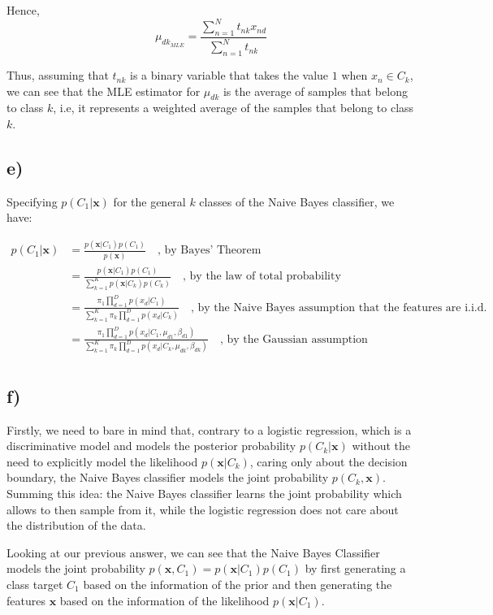 \documentclass[12pt,a4paper,oneside]{paper}
\begin{document}
Hence, 
$$
\mu_{dk_{MLE}} = \frac{\sum_{n=1}^{N} t_{nk} x_{nd}}{\sum_{n=1}^{N} t_{nk}}
$$

Thus, assuming that $t_{nk}$ is a binary variable that takes the value $1$ when $x_n \in C_k$, we can see that the MLE estimator for $\mu_{dk}$ is the average of samples that belong to class $k$, i.e, 
it represents a weighted average of the samples that belong to class $k$.

\newpage
\subsection*{e)}

Specifying $p(C_1 | \bm{x})$ for the general $k$ classes of the Naive Bayes classifier, we have:

\begin{align*}
    p(C_1 | \bm{x}) &= \frac{p(\bm{x} | C_1) p(C_1)}{p(\bm{x})} \quad \text{, by Bayes' Theorem} \\
    &= \frac{p(\bm{x} | C_1) p(C_1)}{\sum_{k=1}^{K} p(\bm{x} | C_k) p(C_k)} \quad \text{, by the law of total probability} \\
    &= \frac{\pi_1 \prod_{d=1}^{D} p(x_d | C_1)}{\sum_{k=1}^{K} \pi_k \prod_{d=1}^{D} p(x_d | C_k)} \quad \text{, by the Naive Bayes assumption that the features are i.i.d.} \\
    &= \frac{\pi_1 \prod_{d=1}^{D} p(x_d | C_1, \mu_{d1}, \beta_{d1})}{\sum_{k=1}^{K} \pi_k \prod_{d=1}^{D} p(x_d | C_k, \mu_{dk}, \beta_{dk})} \quad \text{, by the Gaussian assumption} \\
\end{align*}

\newpage
\subsection*{f)}

Firstly, we need to bare in mind that, contrary to a logistic regression, which is a discriminative model and
models the posterior probability $p(C_k | \bm{x})$ without the need to explicitly model the likelihood $p(\bm{x} | C_k)$, caring only about the decision boundary, the Naive Bayes
classifier models the joint probability $p(C_k, \bm{x})$. Summing this idea: the Naive Bayes classifier learns the joint probability
which allows to then sample from it, while the logistic regression does not care about the distribution of the data. 

Looking at our previous answer, we can see that the Naive Bayes Classifier models the joint probability
$p(\bm{x}, C_1) = p(\bm{x} | C_1) p(C_1)$ by first generating a class target $C_1$ based on the information of the prior and
then generating the features $\bm{x}$ based on the information of the likelihood $p(\bm{x} | C_1)$. 
\end{document}
